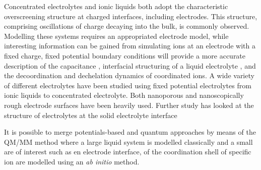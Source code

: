 \documentclass[../main.tex]{subfiles}
\begin{document}
Concentrated electrolytes and ionic liquids both adopt the characteristic overscreening structure at charged interfaces, including electrodes. This structure, comprising oscillations of charge decaying into the bulk, is commonly observed\cite{coles_correlation_2020}. Modelling these systems requires an appropriated electrode model, while interesting information can be gained from simulating ions at an electrode with a fixed charge, fixed potential boundary conditions will provide a more accurate description of the capacitance \cite{merlet_simulating_2013, scalfi_semiclassical_2020}, interfacial structuring of a liquid electrolyte \cite{coles_simulation_2019, vatamanu_ramifications_2017, li_capacitive_2018}, and the decoordination and dechelation dynamics of coordinated ions\cite{vatamanu_molecular_2009}. A wide variety of different electrolytes have been studied using fixed potential electrolytes from ionic liquids to concentrated electrolyte. Both nanoporous \cite{merlet_highly_2013, merlet_molecular_2012, vatamanu_molecular_2009, vatamanu_ramifications_2017} and nanoscopically rough electrode surfaces have been heavily used\cite{vatamanu_influence_2011}. Further study has looked at the structure of electrolytes at the solid electrolyte interface\cite{borodin_interfacial_2014}

It is possible to merge potentials-based and quantum approaches by means of the QM/MM method where a large liquid system is modelled classically and a small are of interest such as en electrode interface, of the coordination shell of specific ion are modelled using an \textit{ab initio} method.

\end{document}
